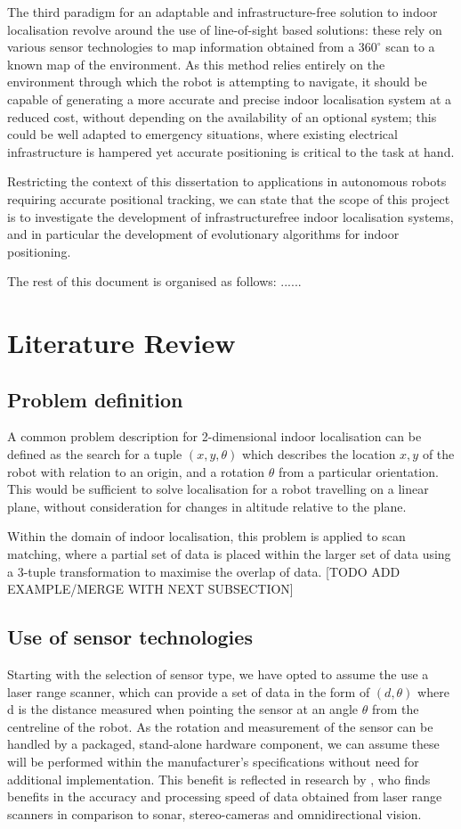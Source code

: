 \documentclass[authoryearcitations]{UoYCSproject}
\begin{document}
The third paradigm for an adaptable and infrastructure-free solution to indoor localisation revolve around the use of line-of-sight based solutions: these rely on various sensor technologies to map information obtained from a  $360^{\circ}$ scan to a known map of the environment. As this method relies entirely on the environment through which the robot is attempting to navigate, it should be capable of generating a more accurate and precise indoor localisation system at a reduced cost, without depending on the availability of an optional system; this could be well adapted to emergency situations, where existing electrical infrastructure is hampered yet accurate positioning is critical to the task at hand. 


Restricting the context of this dissertation to applications in autonomous robots requiring accurate positional tracking, we can state that the scope of this project is to investigate the development of infrastructurefree indoor localisation systems, and in particular the development of evolutionary algorithms for indoor positioning.

The rest of this document is organised as follows: ......


\chapter{Literature Review}

\section{Problem definition}
A common problem description for 2-dimensional indoor localisation can be defined as the search for a tuple $(x, y, \theta)$ which describes the location $x, y$ of the robot with relation to an origin, and a rotation $\theta$ from a particular orientation. This would be sufficient to solve localisation for a robot travelling on a linear plane, without consideration for changes in altitude relative to the plane.

Within the domain of indoor localisation, this problem is applied to scan matching, where a partial set of data is placed within the larger set of data using a 3-tuple transformation to maximise the overlap of data. [TODO ADD EXAMPLE/MERGE WITH NEXT SUBSECTION]


\section{Use of sensor technologies}
Starting with the selection of sensor type, we have opted to assume the use a laser range scanner, which can provide a set of data in the form of $(d, \theta)$ where d is the distance measured when pointing the sensor at an angle $\theta$ from the centreline of the robot. As the rotation and measurement of the sensor can be handled by a packaged, stand-alone hardware component, we can assume these will be performed within the manufacturer's specifications without need for additional implementation. This benefit is reflected in research by \citet{Lingemann2005-hm}, who finds benefits in the accuracy and processing speed of data obtained from laser range scanners in comparison to sonar, stereo-cameras and omnidirectional vision.
\end{document}
